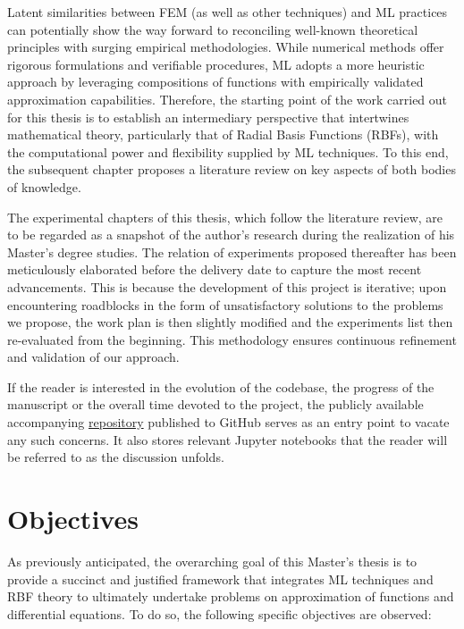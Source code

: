\documentclass[12pt]{report} %
\begin{document}
Latent similarities between FEM (as well as other techniques) and ML practices
can potentially show the way forward to reconciling well-known theoretical principles with
surging empirical methodologies. While numerical
methods offer rigorous formulations and verifiable procedures, ML adopts a more heuristic
approach by leveraging compositions of functions with empirically validated approximation
capabilities. Therefore, the starting point of the work carried out for this thesis is to establish an intermediary perspective that intertwines mathematical theory, particularly that of Radial Basis Functions (RBFs), with the computational power and flexibility supplied by ML techniques. To this end, the subsequent chapter proposes a literature review on key aspects of both bodies of knowledge.

The experimental chapters of this thesis, which follow the literature review, are to be regarded as a snapshot of the author's research during the realization of his Master's degree studies. The relation of experiments proposed thereafter has been meticulously elaborated before the delivery date to capture the most recent advancements. This is because the development of this project is iterative; upon encountering roadblocks in the form of unsatisfactory solutions to the problems we propose, the work plan is then slightly modified and the experiments list then re-evaluated from the beginning. This methodology ensures continuous refinement and validation of our approach.

If the reader is interested in the evolution of the codebase, the progress of the manuscript or the overall time devoted to the project, the publicly available accompanying \href{https://github.com/heqro/tfm-experiments}{repository} published to GitHub serves as an entry point to vacate any such concerns. It also stores relevant Jupyter notebooks that the reader will be referred to as the discussion unfolds.



\section{Objectives}

As previously anticipated, the overarching goal of this Master's thesis is to provide a succinct and justified framework that integrates ML techniques and RBF theory to ultimately undertake problems on approximation of functions and differential equations. To do so, the following specific objectives are observed:
\end{document}
